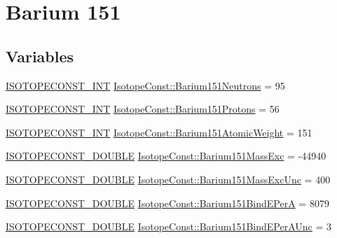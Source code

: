 \hypertarget{group___isotope_const-_barium-_ba151}{}\section{Barium 151}
\label{group___isotope_const-_barium-_ba151}
\subsection*{Variables}
\begin{DoxyCompactItemize}
\item 
\mbox{\hyperlink{group___isotope_const-_macros_ga5f18360b3e99483a35c32d789e62621c}{I\+S\+O\+T\+O\+P\+E\+C\+O\+N\+S\+T\+\_\+\+I\+NT}} \mbox{\hyperlink{group___isotope_const-_barium-_ba151_ga46d10ecf4858355f67ca45e9a418351d}{Isotope\+Const\+::\+Barium151\+Neutrons}} = 95
\item 
\mbox{\hyperlink{group___isotope_const-_macros_ga5f18360b3e99483a35c32d789e62621c}{I\+S\+O\+T\+O\+P\+E\+C\+O\+N\+S\+T\+\_\+\+I\+NT}} \mbox{\hyperlink{group___isotope_const-_barium-_ba151_ga61e66ea47a1cf932e0333c97bf00a070}{Isotope\+Const\+::\+Barium151\+Protons}} = 56
\item 
\mbox{\hyperlink{group___isotope_const-_macros_ga5f18360b3e99483a35c32d789e62621c}{I\+S\+O\+T\+O\+P\+E\+C\+O\+N\+S\+T\+\_\+\+I\+NT}} \mbox{\hyperlink{group___isotope_const-_barium-_ba151_ga5cfd2178725355ea6951ecda7c7802dd}{Isotope\+Const\+::\+Barium151\+Atomic\+Weight}} = 151
\item 
\mbox{\hyperlink{group___isotope_const-_macros_ga8f45a7272ce02c0b4c65c44636ed719a}{I\+S\+O\+T\+O\+P\+E\+C\+O\+N\+S\+T\+\_\+\+D\+O\+U\+B\+LE}} \mbox{\hyperlink{group___isotope_const-_barium-_ba151_ga04567afecdbdfddbace74a1be84765c1}{Isotope\+Const\+::\+Barium151\+Mass\+Exc}} = -\/44940
\item 
\mbox{\hyperlink{group___isotope_const-_macros_ga8f45a7272ce02c0b4c65c44636ed719a}{I\+S\+O\+T\+O\+P\+E\+C\+O\+N\+S\+T\+\_\+\+D\+O\+U\+B\+LE}} \mbox{\hyperlink{group___isotope_const-_barium-_ba151_gac934d37bc7b015af913ec63a40625636}{Isotope\+Const\+::\+Barium151\+Mass\+Exc\+Unc}} = 400
\item 
\mbox{\hyperlink{group___isotope_const-_macros_ga8f45a7272ce02c0b4c65c44636ed719a}{I\+S\+O\+T\+O\+P\+E\+C\+O\+N\+S\+T\+\_\+\+D\+O\+U\+B\+LE}} \mbox{\hyperlink{group___isotope_const-_barium-_ba151_ga2d6ede88d186a9728b91ce62cac93684}{Isotope\+Const\+::\+Barium151\+Bind\+E\+PerA}} = 8079
\item 
\mbox{\hyperlink{group___isotope_const-_macros_ga8f45a7272ce02c0b4c65c44636ed719a}{I\+S\+O\+T\+O\+P\+E\+C\+O\+N\+S\+T\+\_\+\+D\+O\+U\+B\+LE}} \mbox{\hyperlink{group___isotope_const-_barium-_ba151_ga1f89a31cb99b8e056f73b280551b37f4}{Isotope\+Const\+::\+Barium151\+Bind\+E\+Per\+A\+Unc}} = 3

\end{DoxyCompactItemize}
